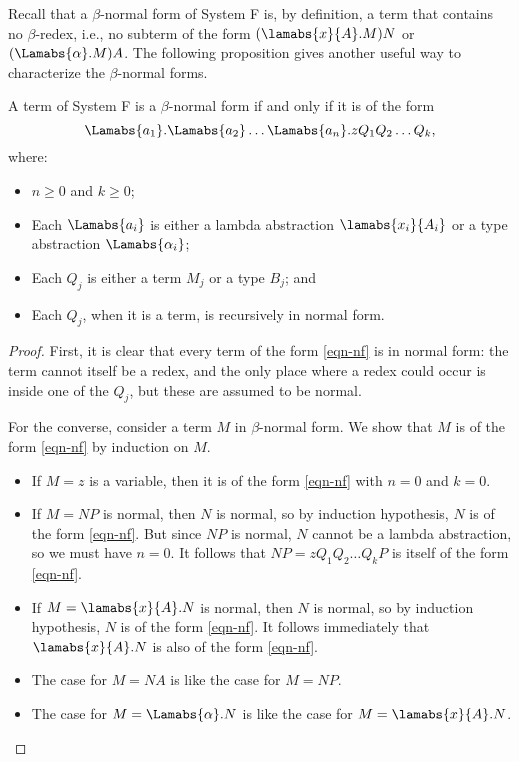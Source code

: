 \documentclass[12pt]{article}
\begin{document}
Recall that a $\beta$-normal form of System F is, by definition, a
term that contains no $\beta$-redex, i.e., no subterm of the form
$(\lamabs{x}{A}.M)N$ or $(\Lamabs{\alpha}.M)A$. The following
proposition gives another useful way to characterize the
$\beta$-normal forms.

\begin{proposition}
  A term of System F is a $\beta$-normal form if and only if it is of
  the form
  \begin{equation}\label{eqn-nf}
    \Lamabs{a_1}.\Lamabs{a_2}\ldots\Lamabs{a_n}.zQ_1Q_2\ldots Q_k,
  \end{equation}
  where:\rm
  \begin{itemize}
  \item $n\geq 0$ and $k\geq 0$;
  \item Each $\Lamabs{a_i}$ is either a lambda abstraction
    $\lamabs{x_i}{A_i}$ or a type abstraction $\Lamabs{\alpha_i}$;
  \item Each $Q_j$ is either a term $M_j$ or a type $B_j$; and
  \item Each $Q_j$, when it is a term, is recursively in normal form.
  \end{itemize}
\end{proposition}

\begin{proof}
  First, it is clear that every term of the form {\eqref{eqn-nf}} is
  in normal form: the term cannot itself be a redex, and the only
  place where a redex could occur is inside one of the $Q_j$, but
  these are assumed to be normal. 

  For the converse, consider a term $M$ in $\beta$-normal form. We
  show that $M$ is of the form {\eqref{eqn-nf}} by induction on $M$. 
  \begin{itemize}
  \item If $M=z$ is a variable, then it is of the form
    {\eqref{eqn-nf}} with $n=0$ and $k=0$.
  \item If $M=NP$ is normal, then $N$ is normal, so
    by induction hypothesis, $N$ is of the form {\eqref{eqn-nf}}. But
    since $NP$ is normal, $N$ cannot be a lambda abstraction, so we
    must have $n=0$. It follows that $NP=zQ_1Q_2\ldots Q_kP$ is itself
    of the form {\eqref{eqn-nf}}.
  \item If $M=\lamabs{x}{A}.N$ is normal, then $N$ is normal, so by
    induction hypothesis, $N$ is of the form {\eqref{eqn-nf}}. It
    follows immediately that $\lamabs{x}{A}.N$ is also of the form
    {\eqref{eqn-nf}}.
  \item The case for $M=NA$ is like the case for $M=NP$. 
  \item The case for $M=\Lamabs{\alpha}.N$ is like the case for
    $M=\lamabs{x}{A}.N$.\eot
  \end{itemize}
\end{proof}
\end{document}

